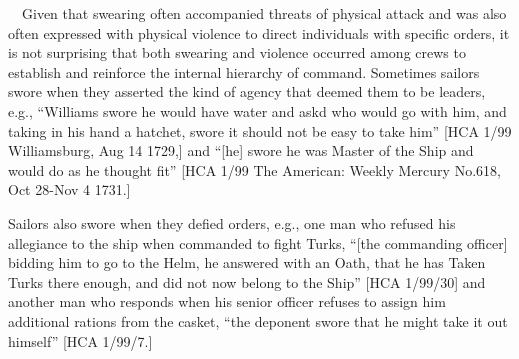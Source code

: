 \begin{styleStandard}
\ \ Given that swearing often accompanied threats of physical attack and was also often expressed with physical violence to direct individuals with specific orders, it is not surprising that both swearing and violence occurred among crews to establish and reinforce the internal hierarchy of command. Sometimes sailors swore when they asserted the kind of agency that deemed them to be leaders, e.g., “Williams swore he would have water and askd who would go with him, and taking in his hand a hatchet, swore it should not be easy to take him” [HCA 1/99 Williamsburg, Aug 14 1729,] and “[he] swore he was Master of the Ship and would do as he thought fit” [HCA 1/99 The American: Weekly Mercury No.618, Oct 28-Nov 4 1731.] 
\end{styleStandard}


\begin{styleStandard}
Sailors also swore when they defied orders, e.g., one man who refused his allegiance to the ship when commanded to fight Turks, “[the commanding officer] bidding him to go to the Helm, he answered with an Oath, that he has Taken Turks there enough, and did not now belong to the Ship” [HCA 1/99/30] and another man who responds when his senior officer refuses to assign him additional rations from the casket, “the deponent swore that he might take it out himself” [HCA 1/99/7.] 
\end{styleStandard}


